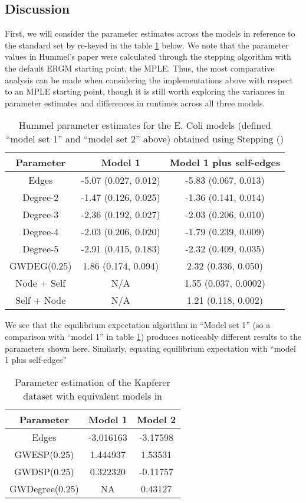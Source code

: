 \subsection{Discussion}

First, we will consider the parameter estimates across the models in reference to the standard set by \cite{hummels2012} re-keyed in the table \ref{t:hummel_ecoli} below. We note that the parameter values in Hummel's paper were calculated through the stepping algorithm with the default ERGM starting point, the MPLE. Thus, the most comparative analysis can be made when considering the implementations above with respect to an MPLE starting point, though it is still worth exploring the variances in parameter estimates and differences in runtimes across all three models.

\begin{table}[H]
\centering
\begin{tabular}{||c|c|c||}
\hline
Parameter & Model 1 & Model 1 plus self-edges \\
\hline
Edges & -5.07 (0.027, 0.012) & -5.83 (0.067, 0.013) \\
\hline 
Degree-2 & -1.47 (0.126, 0.025) & -1.36 (0.141, 0.014) \\
\hline
Degree-3 & -2.36 (0.192, 0.027) & -2.03 (0.206, 0.010) \\ 
\hline
Degree-4 & -2.03 (0.206, 0.020) & -1.79 (0.239, 0.009) \\
\hline
Degree-5 & -2.91 (0.415, 0.183) & -2.32 (0.409, 0.035) \\
\hline
GWDEG(0.25) & 1.86 (0.174, 0.094) & 2.32 (0.336, 0.050) \\
\hline
Node + Self & N/A & 1.55 (0.037, 0.0002) \\
\hline
Self + Node & N/A & 1.21 (0.118, 0.002) \\
\hline
\end{tabular}
\label{t:hummel_ecoli}
\caption{Hummel parameter estimates for the E. Coli models (defined ``model set 1'' and ``model set 2'' above) obtained using Stepping (\cite{hummels2012})}
\end{table} 

We see that the equilibrium expectation algorithm in ``Model set 1'' (so a comparison with ``model 1'' in table \ref{t:hummel_ecoli}) produces noticeably different results to the parameters shown here. Similarly, equating equilibrium expectation with ``model 1 plus self-edges'' 


\begin{table}[H]
\centering
\begin{tabular}{||c|c|c||}
\hline
Parameter & Model 1 & Model 2 \\
\hline
Edges & -3.016163 & -3.17598 \\
\hline
GWESP(0.25) & 1.444937 & 1.53531 \\
\hline
GWDSP(0.25) & 0.322320 & -0.11757 \\
\hline
GWDegree(0.25) & NA & 0.43127 \\
\hline
\end{tabular}
\label{t:hummel_kapferer}
\caption{Parameter estimation of the Kapferer dataset with equivalent models in \cite{hummels2012}}
\end{table}

